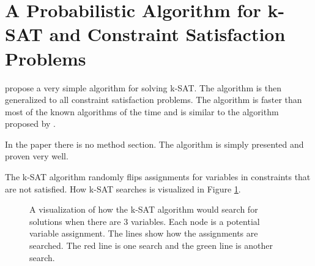 \documentclass[msc,lith,english]{liuthesis}
\begin{document}
\section{A Probabilistic Algorithm for k-SAT and Constraint Satisfaction Problems}
\citeauthor{sourceProbAlgo} \cite{sourceProbAlgo} propose a very simple algorithm for solving k-SAT.
The algorithm is then generalized to all constraint satisfaction problems. The
algorithm is faster than most of the known algorithms of the time and is
similar to the algorithm proposed by \citeauthor{sourceNoRainbow} \cite{sourceNoRainbow}.

In the paper there is no method section. The algorithm is simply presented and proven very well. 

The k-SAT algorithm randomly flips assignments for variables in constraints that are not satisfied.
How k-SAT searches is visualized in Figure \ref{figKSATSearch}.

\begin{center}
\begin{figure}[h]
\centering
{}
\caption{A visualization of how the k-SAT algorithm would search for solutions when there are 3 variables. Each node is a potential variable assignment. The lines show how the assignments are searched. The red line is one search and the green line is another search.}
\label{figKSATSearch}
\end{figure}
\end{center}
\end{document}
